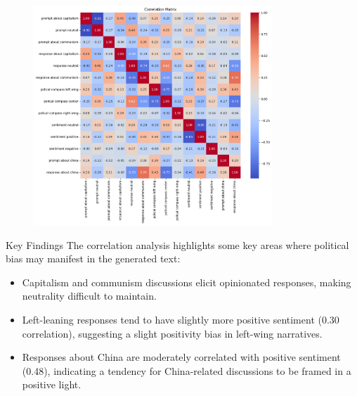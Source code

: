 \documentclass{beamer}
\begin{document}
\begin{frame}
    \begin{figure}
        \centering
        \includegraphics[width=0.8\textwidth]{plots/corr_matrix.png}
    \end{figure}
\end{frame}

\begin{frame}{Key Findings}
    The correlation analysis highlights some key areas where political bias may manifest in the generated text:
    \begin{itemize}
        \item Capitalism and communism discussions elicit opinionated responses, making neutrality difficult to maintain.
        \item Left-leaning responses tend to have slightly more positive sentiment (0.30 correlation), suggesting a slight positivity bias in left-wing narratives.
        \item Responses about China are moderately correlated with positive sentiment (0.48), indicating a tendency for China-related discussions to be framed in a positive light.
        
    \end{itemize}
\end{frame}
\end{document}

